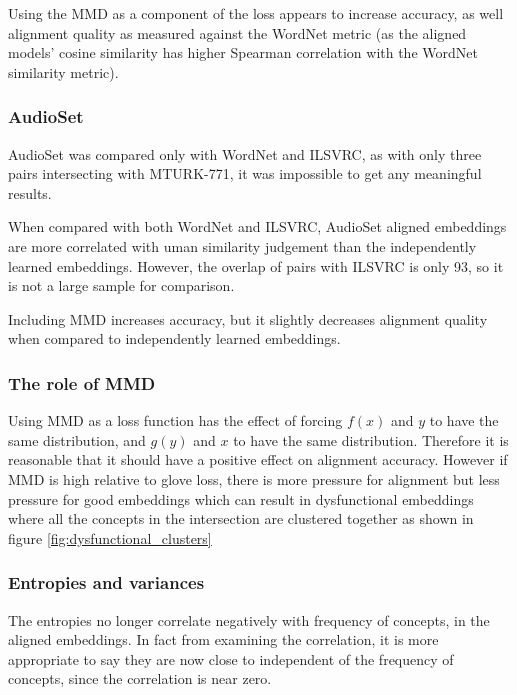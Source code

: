Using the MMD as a component of the loss appears to increase accuracy, as well alignment quality as measured against the WordNet metric (as the aligned models' cosine similarity has higher Spearman correlation with the WordNet similarity metric). 

\subsubsection{AudioSet}

AudioSet was compared only with WordNet and ILSVRC, as with only three pairs intersecting with MTURK-771, it was impossible to get any meaningful results. 

When compared with both WordNet and ILSVRC, AudioSet aligned embeddings are more correlated with uman similarity judgement than the independently learned embeddings. However, the overlap of pairs with ILSVRC is only 93, so it is not a large sample for comparison. 

Including MMD increases accuracy, but it slightly decreases alignment quality when compared to independently learned embeddings. 

\subsubsection{The role of MMD}

Using MMD as a loss function has the effect of forcing $f(x)$ and $y$ to have the same distribution, and  $g(y)$ and $x$ to have the same distribution. Therefore it is reasonable that it should have a positive effect on alignment accuracy. However if MMD is high relative to glove loss, there is more pressure for alignment but less pressure for good embeddings which can result in dysfunctional embeddings where all the concepts in the intersection are clustered together as shown in figure \ref{fig:dysfunctional_clusters}

\subsubsection{Entropies and variances}

The entropies no longer correlate negatively with frequency of concepts, in the aligned embeddings. In fact from examining the correlation, it is more appropriate to say they are now close to independent of the frequency of concepts, since the correlation is near zero. 

